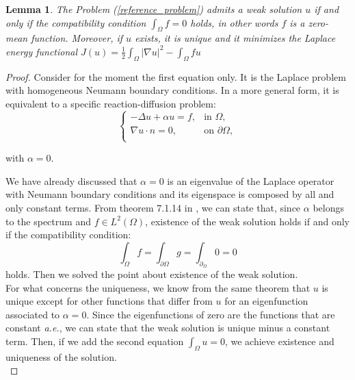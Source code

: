 \documentclass[a4paper,11pt]{article}
\newtheorem{lemma}{Lemma}
\begin{document}
\begin{lemma}
	The Problem (\ref{reference_problem}) admits a weak solution $u$ if and only if the compatibility condition $\int_{\Omega} f = 0$ holds, in other words $f$ is a zero-mean function. Moreover, if $u$ exists, it is unique and it minimizes the Laplace energy functional $J(u) = \frac{1}{2}\int_{\Omega} |\nabla u |^2 - \int_{\Omega}fu$
\end{lemma} \vspace{1mm}
\begin{proof}
	Consider for the moment the first equation only. It is the Laplace problem with homogeneous Neumann boundary conditions. In a more general form, it is equivalent to a specific reaction-diffusion problem:
	\begin{equation*}
	\begin{cases}
	-\Delta{u} + \alpha u =f, & \text{in } \Omega,\\
	\nabla u \cdot n = 0, & \text{on } \partial \Omega, \\
	\end{cases}
	\end{equation*}
	\begin{center}
		with $\alpha = 0$.
	\end{center}
     We have already discussed that $\alpha=0$ is an eigenvalue of the Laplace operator with Neumann boundary conditions and its eigenspace is composed by all and only constant terms. From theorem 7.1.14 in \cite{gazzola}, we can state that, since $\alpha$ belongs to the spectrum and $f\in L^2(\Omega)$, existence of the weak solution holds if and only if the compatibility condition:
     \begin{equation*}
     \int_{\Omega}f = \int_{\partial \Omega} g = \int_{\partial_\Omega} 0 = 0 
     \end{equation*}
     holds. Then we solved the point about existence of the weak solution. \\
     
     \noindent For what concerns the uniqueness, we know from the same theorem that $u$ is unique except for other functions that differ from $u$ for an eigenfunction associated to $\alpha=0$. Since the eigenfunctions of zero are the functions that are constant \emph{a.e.}, we can state that the weak solution is unique minus a constant term. Then, if we add the second equation $\int_{\Omega}u = 0$, we achieve existence and uniqueness of the solution. \\
     

\end{proof}
\end{document}
